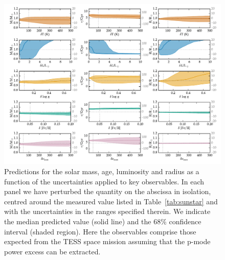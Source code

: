 \iffalse
\begin{figure}
    \centering
    \includegraphics[width=0.95\textheight,height=0.95\textwidth,keepaspectratio, angle=90]{tess2.pdf}
    \caption{Predictions for the solar mass, age, luminosity and radius as a function of the uncertainties applied to key observables. In each panel we have perturbed the quantity on the abscissa in isolation, centred around the measured value listed in  Table~\ref{tab:sunstar} and with the uncertainties in the ranges specified therein. We indicate the median predicted value (solid line) and the 68\%  confidence interval (shaded region). Here the observables comprise those expected from the TESS space mission assuming that the p-mode power excess can be extracted.} 
    \label{fig:uncerttess}
\end{figure}

